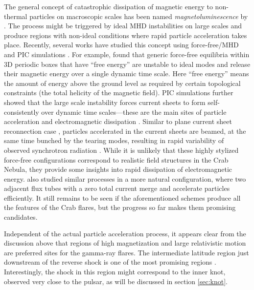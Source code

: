 The general concept of catastrophic dissipation of magnetic energy to non-thermal particles on macroscopic scales has been named \textit{magnetoluminescence} by \citet{Blandford_2014}. The process might be triggered by ideal MHD instabilities on large scales and produce regions with non-ideal conditions where rapid particle acceleration takes place. Recently, several works have studied this concept using force-free/MHD \citep{East_2015,2016arXiv160305731L,Zrake_2016} and PIC simulations \citep{2016arXiv160305731L,Nalewajko_2016,Yuan_2016}. For example, \citet{East_2015} found that generic force-free equilibria within 3D periodic boxes that have ``free energy'' are unstable to ideal modes and release their magnetic energy over a single dynamic time scale. Here ``free energy'' means the amount of energy above the ground level as required by certain topological constraints (the total helicity of the magnetic field). PIC simulations further showed that the large scale instability forces current sheets to form self-consistently over dynamic time scales---these are the main sites of particle acceleration and electromagnetic dissipation \citep{2016arXiv160305731L,Nalewajko_2016,Yuan_2016}. Similar to plane current sheet reconnection case \cite{Cerutti_2013,Cerutti_2014}, particles accelerated in the current sheets are beamed, at the same time bunched by the tearing modes, resulting in rapid variability of observed synchrotron radiation \citep{Yuan_2016}. While it is unlikely that these highly stylized force-free configurations correspond to realistic field structures in the Crab Nebula, they provide some insights into rapid dissipation of electromagnetic energy. \citet{2016arXiv160305731L} also studied similar processes in a more natural configuration, where two adjacent flux tubes with a zero total current merge and accelerate particles efficiently. It still remains to be seen if the aforementioned schemes produce all the features of the Crab flares, but the progress so far makes them promising candidates.

Independent of the actual particle acceleration process, it appears clear from the discussion above that regions of high magnetization and large relativistic motion are preferred sites for the gamma-ray flares. The intermediate latitude region just downstream of the reverse shock is one of the most promising regions \citet{2016arXiv160305731L}. Interestingly, the shock in this region might correspond to the inner knot, observed very close to the pulsar, as will be discussed in section \ref{sec:knot}. 